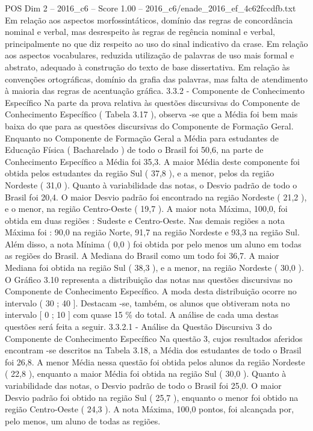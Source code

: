 \begin{textsample}{POS Dim 2 – 2016\_c6 – Score 1.00 – 2016\_c6/enade\_2016\_ef\_4c62fccdfb.txt}
Em relação aos aspectos morfossintáticos, domínio das regras de concordância nominal e verbal, mas desrespeito às regras de regência nominal e verbal, principalmente no que diz respeito ao uso do sinal indicativo da crase.
Em relação aos aspectos vocabulares, reduzida utilização de palavras de uso mais formal e abstrato, adequado à construção do texto de base dissertativa.
Em relação às convenções ortográficas, domínio da grafia das palavras, mas falta de atendimento à maioria das regras de acentuação gráfica. 3.3.2 - Componente de Conhecimento Específico Na parte da prova relativa às questões discursivas do Componente de Conhecimento Específico ( Tabela 3.17 ), observa -se que a Média foi bem mais baixa do que para as questões discursivas do Componente de Formação Geral.
Enquanto no Componente de Formação Geral a Média para estudantes de Educação Física ( Bacharelado ) de todo o Brasil foi 50,6, na parte de Conhecimento Específico a Média foi 35,3.
A maior Média deste componente foi obtida pelos estudantes da região Sul ( 37,8 ), e a menor, pelos da região Nordeste ( 31,0 ).
Quanto à variabilidade das notas, o Desvio padrão de todo o Brasil foi 20,4.
O maior Desvio padrão foi encontrado na região Nordeste ( 21,2 ), e o menor, na região Centro-Oeste ( 19,7 ).
A maior nota Máxima, 100,0, foi obtida em duas regiões : Sudeste e Centro-Oeste.
Nas demais regiões a nota Máxima foi : 90,0 na região Norte, 91,7 na região Nordeste e 93,3 na região Sul.
Além disso, a nota Mínima ( 0,0 ) foi obtida por pelo menos um aluno em todas as regiões do Brasil.
A Mediana do Brasil como um todo foi 36,7.
A maior Mediana foi obtida na região Sul ( 38,3 ), e a menor, na região Nordeste ( 30,0 ).
O Gráfico 3.10 representa a distribuição das notas nas questões discursivas no Componente de Conhecimento Específico.
A moda desta distribuição ocorre no intervalo ( 30 ; 40 ].
Destacam -se, também, os alunos que obtiveram nota no intervalo [ 0 ; 10 ] com quase 15 \% do total.
A análise de cada uma destas questões será feita a seguir. 3.3.2.1 - Análise da Questão Discursiva 3 do Componente de Conhecimento Específico Na questão 3, cujos resultados aferidos encontram -se descritos na Tabela 3.18, a Média dos estudantes de todo o Brasil foi 26,8.
A menor Média nessa questão foi obtida pelos alunos da região Nordeste ( 22,8 ), enquanto a maior Média foi obtida na região Sul ( 30,0 ).
Quanto à variabilidade das notas, o Desvio padrão de todo o Brasil foi 25,0.
O maior Desvio padrão foi obtido na região Sul ( 25,7 ), enquanto o menor foi obtido na região Centro-Oeste ( 24,3 ).
A nota Máxima, 100,0 pontos, foi alcançada por, pelo menos, um aluno de todas as regiões.

\end{textsample}
